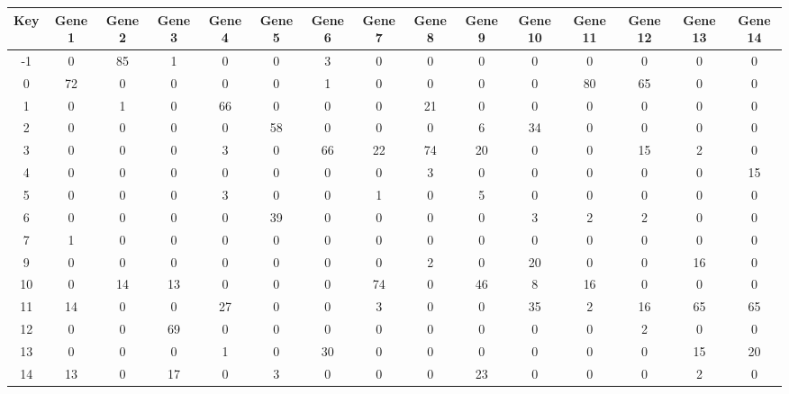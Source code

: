 \begin{tabular}{|c|c|c|c|c|c|c|c|c|c|c|c|c|c|c|}
\hline
Key & Gene 1 & Gene 2 & Gene 3 & Gene 4 & Gene 5 & Gene 6 & Gene 7 & Gene 8 & Gene 9 & Gene 10 & Gene 11 & Gene 12 & Gene 13 & Gene 14 \\
\hline
-1 & 0 & 85 & 1 & 0 & 0 & 3 & 0 & 0 & 0 & 0 & 0 & 0 & 0 & 0 \\
0 & 72 & 0 & 0 & 0 & 0 & 1 & 0 & 0 & 0 & 0 & 80 & 65 & 0 & 0 \\
1 & 0 & 1 & 0 & 66 & 0 & 0 & 0 & 21 & 0 & 0 & 0 & 0 & 0 & 0 \\
2 & 0 & 0 & 0 & 0 & 58 & 0 & 0 & 0 & 6 & 34 & 0 & 0 & 0 & 0 \\
3 & 0 & 0 & 0 & 3 & 0 & 66 & 22 & 74 & 20 & 0 & 0 & 15 & 2 & 0 \\
4 & 0 & 0 & 0 & 0 & 0 & 0 & 0 & 3 & 0 & 0 & 0 & 0 & 0 & 15 \\
5 & 0 & 0 & 0 & 3 & 0 & 0 & 1 & 0 & 5 & 0 & 0 & 0 & 0 & 0 \\
6 & 0 & 0 & 0 & 0 & 39 & 0 & 0 & 0 & 0 & 3 & 2 & 2 & 0 & 0 \\
7 & 1 & 0 & 0 & 0 & 0 & 0 & 0 & 0 & 0 & 0 & 0 & 0 & 0 & 0 \\
9 & 0 & 0 & 0 & 0 & 0 & 0 & 0 & 2 & 0 & 20 & 0 & 0 & 16 & 0 \\
10 & 0 & 14 & 13 & 0 & 0 & 0 & 74 & 0 & 46 & 8 & 16 & 0 & 0 & 0 \\
11 & 14 & 0 & 0 & 27 & 0 & 0 & 3 & 0 & 0 & 35 & 2 & 16 & 65 & 65 \\
12 & 0 & 0 & 69 & 0 & 0 & 0 & 0 & 0 & 0 & 0 & 0 & 2 & 0 & 0 \\
13 & 0 & 0 & 0 & 1 & 0 & 30 & 0 & 0 & 0 & 0 & 0 & 0 & 15 & 20 \\
14 & 13 & 0 & 17 & 0 & 3 & 0 & 0 & 0 & 23 & 0 & 0 & 0 & 2 & 0 \\
\hline
\end{tabular}